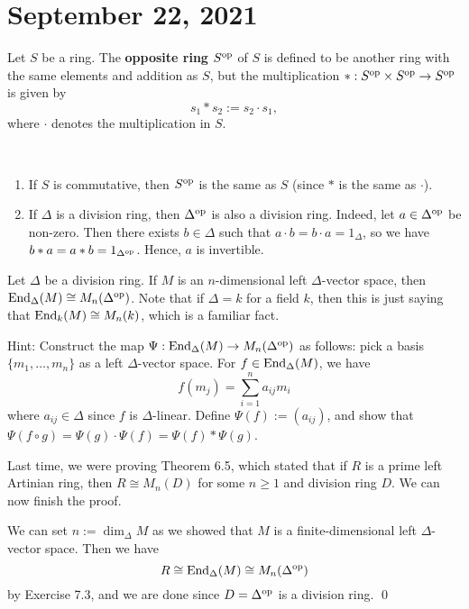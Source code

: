 \section{September 22, 2021}

\begin{defn}
Let $S$ be a ring. The {\bf opposite ring} $S^{\operatorname{op}}$ of $S$ is defined to be another ring with 
the same elements and addition as $S$, but the multiplication $* : S^{\operatorname{op}} \times S^{\operatorname{op}} \to S^{\operatorname{op}}$ is given by 
\[ s_1 * s_2 := s_2 \cdot s_1, \]
where $\cdot$ denotes the multiplication in $S$. 
\end{defn}

\begin{remark}~
\begin{enumerate}[(1)]
    \item If $S$ is commutative, then $S^{\operatorname{op}}$ is the same as $S$ (since $*$ is the same as $\cdot$).
    \item If $\Delta$ is a division ring, then $\Delta^{\operatorname{op}}$ is also a division ring. Indeed, 
    let $a \in \Delta^{\operatorname{op}}$ be non-zero. Then there exists $b \in \Delta$ such that 
    $a \cdot b = b \cdot a = 1_\Delta$, so we have $b * a = a * b = 1_{\Delta^{\operatorname{op}}}$. Hence, 
    $a$ is invertible. 
\end{enumerate}
\end{remark}

\begin{exercise}
Let $\Delta$ be a division ring. If $M$ is an $n$-dimensional left $\Delta$-vector space, then 
$\operatorname{End}_\Delta(M) \cong M_n(\Delta^{\operatorname{op}})$. Note that if $\Delta = k$ for a field $k$, then this is just saying that $\operatorname{End}_k(M) \cong M_n(k)$, which is a familiar fact.

Hint: Construct the map $\Psi : \operatorname{End}_\Delta(M) \to M_n(\Delta^{\operatorname{op}})$ as follows: pick a basis 
$\{m_1, \dots, m_n\}$ as a left $\Delta$-vector space. For $f \in \operatorname{End}_\Delta(M)$, we have 
\[ f(m_j) = \sum_{i=1}^n a_{ij} m_i \]
where $a_{ij} \in \Delta$ since $f$ is $\Delta$-linear. Define $\Psi(f) := (a_{ij})$, and 
show that $\Psi(f \circ g) = \Psi(g) \cdot \Psi(f) = \Psi(f) * \Psi(g)$. 
\end{exercise}

Last time, we were proving Theorem 6.5, which stated that if $R$ is a prime left Artinian ring, 
then $R \cong M_n(D)$ for some $n \geq 1$ and division ring $D$. We can now finish the proof. 

We can set $n := \dim_\Delta M$ as we showed that $M$ is a finite-dimensional left $\Delta$-vector space.
Then we have 
\[ R \cong \operatorname{End}_\Delta(M) \cong M_n(\Delta^{\operatorname{op}}) \]
by Exercise 7.3, and we are done since $D = \Delta^{\operatorname{op}}$ is a division ring. \qed

